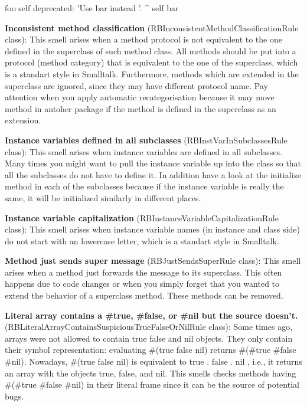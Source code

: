 	foo
		self deprecated: 'Use bar instead '. 
		^ self bar
		 

\textbf{Inconsistent method classification} (RBInconsistentMethodClassificationRule class): This smell arises when a method protocol is not equivalent to the one defined in the superclass of such method class. All methods should be put into a protocol (method category) that is equivalent to the one of the superclass, which is a standart style in Smalltalk. Furthermore, methods which are extended in the superclass are ignored, since they may have different protocol name. Pay attention when you apply automatic recategorisation because it may move method in antoher package if the method is defined in the superclass as an extension.

\textbf{Instance variables defined in all subclasses} (RBInstVarInSubclassesRule class): This smell arises when instance variables are defined in all subclasses. Many times you might want to pull the instance variable up into the class so that all the subclasses do not have to define it. In addition have a look at the initialize method in each of the subclasses because if the instance variable is really the same, it will be initialized similarly in different places.

\textbf{Instance variable capitalization} (RBInstanceVariableCapitalizationRule class): This smell arises when instance variable names (in instance and class side) do not start with an lowercase letter, which is a standart style in Smalltalk.

\textbf{Method just sends super message} (RBJustSendsSuperRule class): This smell arises when a method just forwards the message to its superclass. This often happens due to code changes or when you simply forget that you wanted to extend the behavior of a superclass method. These methods can be removed.

\textbf{Literal array contains a #true, #false, or #nil but the source doesn't.} (RBLiteralArrayContainsSuspiciousTrueFalseOrNilRule class): Some times ago, arrays were not allowed to contain true false and nil objects. They only contain their symbol representation: evaluating \#(true false nil) returns \#(\#true \#false \#nil). 
	Nowadays, \#(true false nil) is equivalent to {true . false . nil }, i.e., it returns an array with the objects true, false, and nil. 
	This smells checks methods having \#(\#true \#false \#nil) in their literal frame since it can be the source of potential bugs. 
	 


